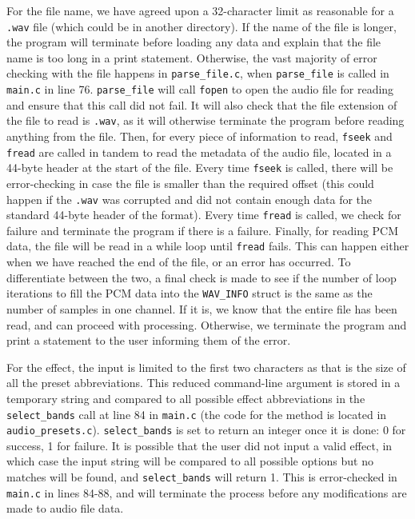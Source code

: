 \documentclass[11pt]{extarticle}
\begin{document}
For the file name, we have agreed upon a 32-character limit as reasonable for a \texttt{.wav} file (which could be in another directory). If the name of the file is longer, the program will terminate before loading any data and explain that the file name is too long in a print statement. Otherwise, the vast majority of error checking with the file happens in \texttt{parse\_file.c}, when \texttt{parse\_file} is called in \texttt{main.c} in line 76. \texttt{parse\_file} will call \texttt{fopen} to open the audio file for reading and ensure that this call did not fail. It will also check that the file extension of the file to read is \texttt{.wav}, as it will otherwise terminate the program before reading anything from the file. Then, for every piece of information to read, \texttt{fseek} and \texttt{fread} are called in tandem to read the metadata of the audio file, located in a 44-byte header at the start of the file. Every time \texttt{fseek} is called, there will be error-checking in case the file is smaller than the required offset (this could happen if the \texttt{.wav} was corrupted and did not contain enough data for the standard 44-byte header of the format). Every time \texttt{fread} is called, we check for failure and terminate the program if there is a failure. Finally, for reading PCM data, the file will be read in a while loop until \texttt{fread} fails. This can happen either when we have reached the end of the file, or an error has occurred. To differentiate between the two, a final check is made to see if the number of loop iterations to fill the PCM data into the \texttt{WAV\_INFO} struct is the same as the number of samples in one channel. If it is, we know that the entire file has been read, and can proceed with processing. Otherwise, we terminate the program and print a statement to the user informing them of the error.

For the effect, the input is limited to the first two characters as that is the size of all the preset abbreviations. This reduced command-line argument is stored in a temporary string and compared to all possible effect abbreviations in the \texttt{select\_bands} call at line 84 in \texttt{main.c} (the code for the method is located in \texttt{audio\_presets.c}). \texttt{select\_bands} is set to return an integer once it is done: 0 for success, 1 for failure. It is possible that the user did not input a valid effect, in which case the input string will be compared to all possible options but no matches will be found, and \texttt{select\_bands} will return 1. This is error-checked in \texttt{main.c} in lines 84-88, and will terminate the process before any modifications are made to audio file data. \\
\end{document}
